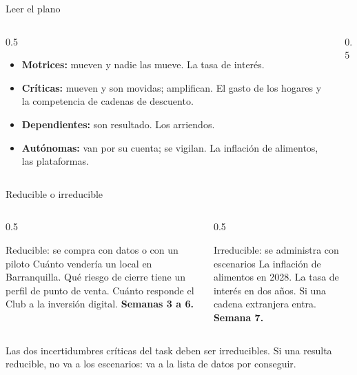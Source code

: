\documentclass{beamer}
\begin{document}
\begin{frame}{Leer el plano}
\begin{columns}[T]
\begin{column}{0.5\textwidth}
\begin{itemize}\itemsep5pt
  \item \textbf{Motrices:} mueven y nadie las mueve. La tasa de interés.
  \item \textbf{Críticas:} mueven y son movidas; amplifican. El gasto de los hogares y la competencia de cadenas de descuento.
  \item \textbf{Dependientes:} son resultado. Los arriendos.
  \item \textbf{Autónomas:} van por su cuenta; se vigilan. La inflación de alimentos, las plataformas.
\end{itemize}
\end{column}
\begin{column}{0.5\textwidth}
\end{column}
\end{columns}
\end{frame}

\begin{frame}{Reducible o irreducible}
\begin{columns}[T]
\begin{column}{0.5\textwidth}
\begin{exampleblock}{Reducible: se compra con datos o con un piloto}
Cuánto vendería un local en Barranquilla. Qué riesgo de cierre tiene un perfil de punto de venta. Cuánto responde el Club a la inversión digital. \textbf{Semanas 3 a 6.}
\end{exampleblock}
\end{column}
\begin{column}{0.5\textwidth}
\begin{alertblock}{Irreducible: se administra con escenarios}
La inflación de alimentos en 2028. La tasa de interés en dos años. Si una cadena extranjera entra. \textbf{Semana 7.}
\end{alertblock}
\end{column}
\end{columns}
\medskip
Las dos incertidumbres críticas del task deben ser irreducibles. Si una resulta reducible, no va a los escenarios: va a la lista de datos por conseguir.
\end{frame}
\end{document}
